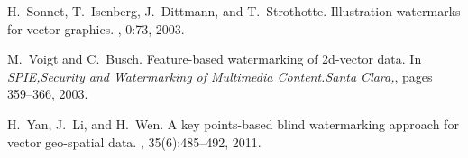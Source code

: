 \documentclass{sig-alternate}%
\begin{document}
\begin{thebibliography}{10}
H.~Sonnet, T.~Isenberg, J.~Dittmann, and T.~Strothotte.
\newblock Illustration watermarks for vector graphics.
,
  0:73, 2003.

M.~Voigt and C.~Busch.
\newblock Feature-based watermarking of 2d-vector data.
\newblock In {\em SPIE,Security and Watermarking of Multimedia Content.Santa
  Clara,}, pages 359--366, 2003.

H.~Yan, J.~Li, and H.~Wen.
\newblock A key points-based blind watermarking approach for vector geo-spatial
  data.
, 35(6):485--492, 2011.

\end{thebibliography}
\end{document}
